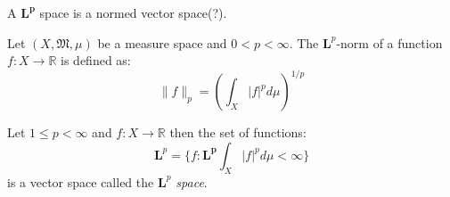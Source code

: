 A $\mathbf{L^p}$ space is a normed vector space(?).
\begin{dfn}
	Let $(X,\mathfrak{M},\mu)$ be a measure space and $0<p<\infty$. The $\mathbf{L}^p$-norm of a function $f:X\rightarrow\mathbb{R}$ is defined as:
	\begin{equation*}
		\|f\|_p=\left(\int_X|f|^pd\mu\right)^{1/p}
	\end{equation*}
\end{dfn}

\begin{dfn}\cite{jones_1}
	
	Let $1\leq p<\infty$ and $f:X\rightarrow\mathbb{R}$ then the set of functions:
	\begin{equation*}
		\mathbf{L}^p=\{f:\mathbf{L^p}\int_X|f|^p d\mu<\infty\}
	\end{equation*}
	is a vector space called the \emph{$\mathbf{L}^p$ space}.
\end{dfn}

\begin{comment}
The following properties are valid. (prove these)
\begin{enumerate}
\item $0\leq\|f\|_P<\infty$
\item $\|f\|_P=0\text{ iff }f=0$
\item $\|cf\|_P=|c| \|f\|_P\text{ if }c\in\mathbb{R}$
\item $\|f+g\|_P\leq\|f\|_P+\|g\|_P$
\end{enumerate}
\end{comment}

